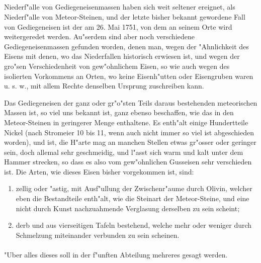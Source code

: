 \documentclass[a4paper, 11pt, oneside, polutonikogreek, german]{article}
\begin{document}
\subsection{}
\paragraph{}
Niederf"alle von Gediegeneisenmassen haben sich weit seltener ereignet, als Niederf"alle von Meteor-Steinen, und der letzte bisher bekannt gewordene Fall von Gediegeneisen ist der am 26. Mai 1751, von dem an seinem Orte wird weitergeredet werden. Au"serdem sind aber noch verschiedene Gediegeneisenmassen gefunden worden, denen man, wegen der "Ahnlichkeit des Eisens mit denen, wo das Niederfallen historisch erwiesen ist, und wegen der gro"sen Verschiedenheit von gew"ohnlichem Eisen, so wie auch wegen des isolierten Vorkommens an Orten, wo keine Eisenh"utten oder Eisengruben waren u. s. w., mit allem Rechte denselben Ursprung zuschreiben kann.

Das Gediegeneisen der ganz oder gr"o"sten Teils daraus bestehenden meteorischen Massen ist, so viel uns bekannt ist, ganz ebenso beschaffen, wie das in den Meteor-Steinen in geringerer Menge enthaltene. Es enth"alt einige Hundertteile Nickel (nach Stromeier 10 bis 11, wenn auch nicht immer so viel ist abgeschieden worden), und ist, die H"arte mag an manchen Stellen etwas gr"osser oder geringer sein, doch allemal sehr geschmeidig, und l"asst sich warm und kalt unter dem Hammer strecken, so dass es also vom gew"ohnlichen Gusseisen sehr verschieden ist. Die Arten, wie dieses Eisen bisher vorgekommen ist, sind:
\begin{enumerate}
    \item zellig oder "astig, mit Ausf"ullung der Zwischenr"aume durch Olivin, welcher eben die Bestandteile enth"alt, wie die Steinart der Meteor-Steine, und eine nicht durch Kunst nachzuahmende Verglasung derselben zu sein scheint;
    \item derb und aus vierseitigen Tafeln bestehend, welche mehr oder weniger durch Schmelzung miteinander verbunden zu sein scheinen.
\end{enumerate}
\paragraph{}
"Uber alles dieses soll in der f"unften Abteilung mehreres gesagt werden.
\subsection{}
\end{document}
